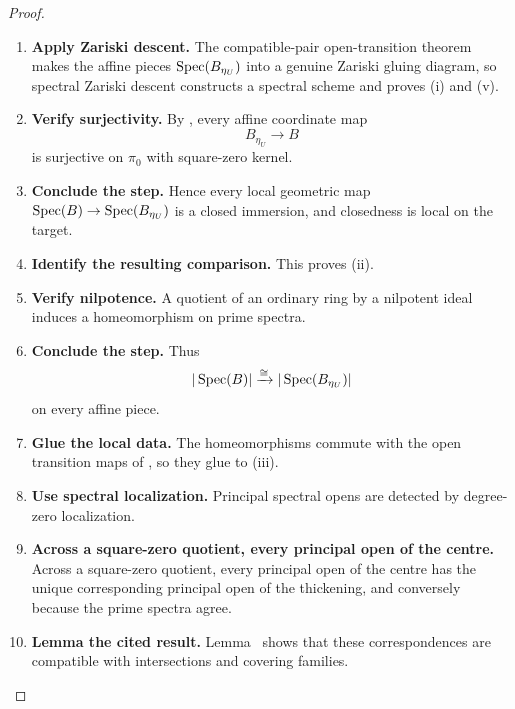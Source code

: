 \begin{proof}
\leavevmode
\begin{enumerate}[label=\textup{(\arabic*)}]
    \item \textbf{Apply Zariski descent.}
    The compatible-pair open-transition theorem
     makes the affine pieces \(\operatorname{Spec}(B_{\eta_U})\) into a
    genuine Zariski gluing diagram, so spectral Zariski descent constructs a spectral scheme and
    proves \textup{(i)} and \textup{(v)}.

    \item \textbf{Verify surjectivity.}
    By , every affine coordinate map
    \[
        B_{\eta_U}\longrightarrow B
    \]
    is surjective on \(\pi_0\) with square-zero kernel.

    \item \textbf{Conclude the step.}
    Hence every local geometric map \(\operatorname{Spec}(B)\to\operatorname{Spec}(B_{\eta_U})\) is a closed immersion, and closedness is local
    on the target.

    \item \textbf{Identify the resulting comparison.}
    This proves \textup{(ii)}.

    \item \textbf{Verify nilpotence.}
    A quotient of an ordinary ring by a nilpotent ideal induces a homeomorphism on prime
    spectra.

    \item \textbf{Conclude the step.}
    Thus
    \[
        |\operatorname{Spec}(B)|\xrightarrow{\cong}|\operatorname{Spec}(B_{\eta_U})|
    \]
    on every affine piece.

    \item \textbf{Glue the local data.}
    The homeomorphisms commute with the open transition maps of
    , so they glue to \textup{(iii)}.

    \item \textbf{Use spectral localization.}
    Principal spectral opens are detected by degree-zero localization.

    \item \textbf{Across a square-zero quotient, every principal open of the centre.}
    Across a square-zero quotient, every principal open of the centre has the unique
    corresponding principal open of the thickening, and conversely because the prime spectra
    agree.

    \item \textbf{Lemma the cited result.}
    Lemma~ shows that these correspondences are
    compatible with intersections and covering families.


\end{enumerate}
\end{proof}
